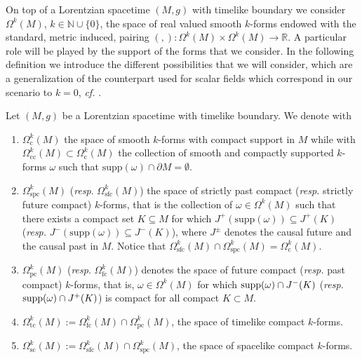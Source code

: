 On top of a Lorentzian spacetime $(M,g)$ with timelike boundary we consider $\Omega^k(M)$, $k\in\mathbb{N}\cup\{0\}$, the space of real valued smooth $k$-forms endowed with the standard, metric induced, pairing $(,):\Omega^k(M)\times\Omega^k(M)\to\mathbb{R}$. A particular role will be played by the support of the forms that we consider. In the following definition we introduce the different possibilities that we will consider, which are a generalization of the counterpart used for scalar fields which correspond in our scenario to $k=0$, \textit{cf.} \cite{Baer-15}.
\begin{Definition}\label{Def: space of forms}
	Let $(M,g)$ be a Lorentzian spacetime with timelike boundary. We denote with 
	\begin{enumerate}
		\item 	$\Omega_{\mathrm{c}}^k(M)$ the space of smooth $k$-forms with compact support in $M$ while with $\Omega_{\mathrm{cc}}^k(M)\subset\Omega^k_{\mathrm{c}}(M)$ the collection of smooth and compactly supported $k$-forms $\omega$ such that $\textrm{supp}(\omega)\cap\partial M=\emptyset$.
		\item
		$\Omega_{\mathrm{spc}}^k(M)$ (\textit{resp}. $\Omega_{\mathrm{sfc}}^k(M)$) the space of strictly past compact (\textit{resp.} strictly future compact) $k$-forms, that is the collection of $\omega\in\Omega^k(M)$ such that there exists a compact set $K\subseteq M$ for which $J^+(\textrm{supp}(\omega))\subseteq J^+(K)$ (\textit{resp.} $J^-(\textrm{supp}(\omega))\subseteq J^-(K)$), where $J^\pm$ denotes the causal future and the causal past in $M$.  Notice that $\Omega_{\mathrm{sfc}}^k(M)\cap\Omega_{\mathrm{spc}}^k(M)=\Omega_{\mathrm{c}}^k(M)$.
		\item
		$\Omega_{\mathrm{pc}}^k(M)$ (\textit{resp}. $\Omega_{\mathrm{fc}}^k(M)$) denotes the space of future compact (\textit{resp.} past compact) $k$-forms, that is, $\omega\in\Omega^k(M)$ for which
		${\rm supp}(\omega)\cap J^-(K)$ (\textit{resp.} ${\rm supp}(\omega)\cap J^+(K)$) is compact for all compact $K\subset M$.
		\item $\Omega_{\mathrm{tc}}^k(M):=\Omega_{\mathrm{fc}}^k(M)\cap\Omega_{\mathrm{pc}}^k(M)$, the space of timelike compact $k$-forms.
		\item $\Omega_{\mathrm{sc}}^k(M):=\Omega_{\mathrm{sfc}}^k(M)\cap\Omega_{\mathrm{spc}}^k(M)$, the space of spacelike compact $k$-forms.
	\end{enumerate}
\end{Definition}


